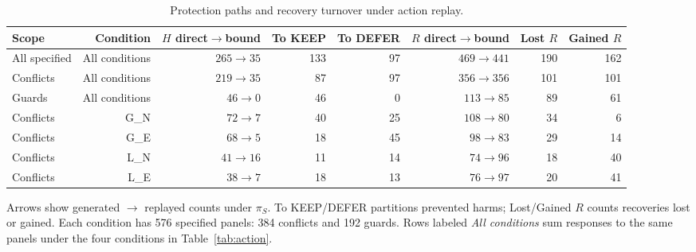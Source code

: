 \begin{table}[t]
\centering
\small
\caption{Protection paths and recovery turnover under action replay.}
\label{tab:action_paths}
\begin{tabular}{lrrrrrrr}
\toprule
Scope & Condition & $H$ direct$\to$bound & To KEEP & To DEFER & $R$ direct$\to$bound & Lost $R$ & Gained $R$ \\
\midrule
All specified & All conditions & $265\to 35$ & 133 & 97 & $469\to 441$ & 190 & 162 \\
Conflicts & All conditions & $219\to 35$ & 87 & 97 & $356\to 356$ & 101 & 101 \\
Guards & All conditions & $46\to 0$ & 46 & 0 & $113\to 85$ & 89 & 61 \\
Conflicts & G\_N & $72\to 7$ & 40 & 25 & $108\to 80$ & 34 & 6 \\
Conflicts & G\_E & $68\to 5$ & 18 & 45 & $98\to 83$ & 29 & 14 \\
Conflicts & L\_N & $41\to 16$ & 11 & 14 & $74\to 96$ & 18 & 40 \\
Conflicts & L\_E & $38\to 7$ & 18 & 13 & $76\to 97$ & 20 & 41 \\
\bottomrule
\end{tabular}
\par\smallskip
\begin{minipage}{\linewidth}
\footnotesize
Arrows show generated $\to$ replayed counts under $\pi_S$. To KEEP/DEFER partitions prevented harms; Lost/Gained $R$ counts recoveries lost or gained. Each condition has 576 specified panels: 384 conflicts and 192 guards. Rows labeled \textit{All conditions} sum responses to the same panels under the four conditions in Table~\ref{tab:action}.
\end{minipage}
\end{table}
